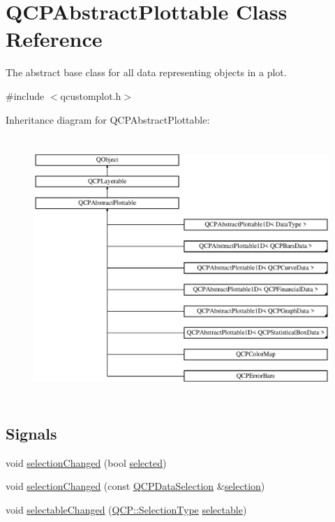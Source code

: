 \hypertarget{class_q_c_p_abstract_plottable}{}\section{Q\+C\+P\+Abstract\+Plottable Class Reference}
\label{class_q_c_p_abstract_plottable}


The abstract base class for all data representing objects in a plot.  




{\ttfamily \#include $<$qcustomplot.\+h$>$}

Inheritance diagram for Q\+C\+P\+Abstract\+Plottable\+:\begin{figure}[H]
\begin{center}
\leavevmode
\includegraphics[height=9.967637cm]{d4/d89/class_q_c_p_abstract_plottable}
\end{center}
\end{figure}
\subsection*{Signals}
\begin{DoxyCompactItemize}
\item 
void \mbox{\hyperlink{class_q_c_p_abstract_plottable_a3af66432b1dca93b28e00e78a8c7c1d9}{selection\+Changed}} (bool \mbox{\hyperlink{class_q_c_p_abstract_plottable_a0b3b514474fe93354fc74cfc144184b4}{selected}})
\item 
void \mbox{\hyperlink{class_q_c_p_abstract_plottable_a787a9c39421059006891744b731fa473}{selection\+Changed}} (const \mbox{\hyperlink{class_q_c_p_data_selection}{Q\+C\+P\+Data\+Selection}} \&\mbox{\hyperlink{class_q_c_p_abstract_plottable_a040bf09f41d456284cfd39cc37aa068f}{selection}})
\item 
void \mbox{\hyperlink{class_q_c_p_abstract_plottable_a663b1a44123c8340ac041a29d1e2c973}{selectable\+Changed}} (\mbox{\hyperlink{namespace_q_c_p_ac6cb9db26a564b27feda362a438db038}{Q\+C\+P\+::\+Selection\+Type}} \mbox{\hyperlink{class_q_c_p_abstract_plottable_a016653741033bd332d1d4c3c725cc284}{selectable}})
\end{DoxyCompactItemize}
